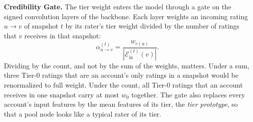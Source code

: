 \documentclass[lettersize,journal]{IEEEtran}
\begin{document}
\smallskip\noindent\textbf{Credibility Gate.}
The tier weight enters the model through a gate on the signed convolution layers of the backbone.
Each layer weights an incoming rating $u \to v$ of snapshot $t$ by its rater's tier weight divided by the number of ratings that $v$ receives in that snapshot:
\begin{equation}
\label{eq:cred_gate}
\alpha^{(t)}_{u \to v} = \frac{w_{c(u)}}{|\mathcal{E}^{(t)}_{\mathrm{in}}(v)|}.
\end{equation}
Dividing by the count, and not by the sum of the weights, matters. Under a sum, three Tier-$0$ ratings that are an account's only ratings in a snapshot would be renormalized to full weight. Under the count, all Tier-$0$ ratings that an account receives in one snapshot carry at most $w_0$ together.
The gate also replaces every account's input features by the mean features of its tier, the \emph{tier prototype}, so that a pool node looks like a typical rater of its tier.
\end{document}
